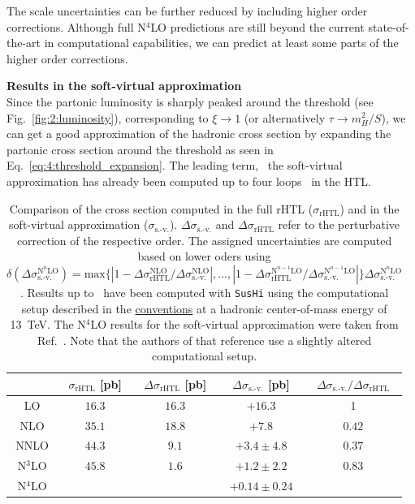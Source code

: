 The scale uncertainties can be further reduced by including higher order corrections. Although full N${}^4$LO predictions are still beyond the current state-of-the-art in computational capabilities, we can predict at least some parts of the higher order corrections.

\textbf{Results in the soft-virtual approximation}\\
Since the partonic luminosity is sharply peaked around the threshold (see Fig.~\ref{fig:2:luminosity}), corresponding to $\xi \rightarrow 1$ (or alternatively $\tau \rightarrow m_H^2/S$), we can get a good approximation of the hadronic cross section by expanding the partonic cross section around the threshold as seen in Eq.~\eqref{eq:4:threshold_expansion}. The leading term, \ie\ the soft-virtual approximation has already been computed up to four loops~\cite{Das:2020adl} in the \acs{HTL}.
\begin{table}[ht]
\centering
\begin{tabular}{ccccc}
& $\sigma_\text{rHTL}$ [pb] & $\Delta \sigma_\text{rHTL}$ [pb] & $\Delta \sigma_{\text{s.-v.}}$ [pb] & $\Delta\sigma_{\text{s.-v.}}/\Delta\sigma_\text{rHTL}$ \\
\hline
LO & $16.3$ & $16.3$ & $+16.3$ & 1 \\
NLO & $35.1$ & $18.8$ & $+7.8$ & $0.42$ \\
NNLO & $44.3$ & $9.1$ & $+3.4 \pm 4.8$ & $0.37$ \\
N${}^3$LO & $45.8$ & $1.6$ & $+1.2 \pm 2.2$ & $0.83$ \\
N${}^4$LO &  &  & $+0.14 \pm 0.24$ & \\
\end{tabular}
\caption{Comparison of the cross section computed in the full \acs{rHTL} ($\sigma_\text{rHTL}$) and in the soft-virtual approximation ($\sigma_{\text{s.-v.}}$). $\Delta \sigma_{\text{s.-v.}}$ and $\Delta \sigma_{\text{rHTL}}$ refer to the perturbative correction of the respective order. The assigned uncertainties are computed based on lower oders using $\delta(\Delta  \sigma^{\text{N}^n\text{LO}}_{\text{s.-v.}}) =  \text{max} \lbrace | 1 - \Delta \sigma^{\text{NLO}}_\text{rHTL}/ \Delta \sigma^{\text{NLO}}_{\text{s.-v.}}|,\ldots,  | 1 - \Delta \sigma^{\text{N}^{n-1}\text{LO}}_\text{rHTL}/\Delta \sigma^{\text{N}^{n-1}\text{LO}}_{\text{s.-v.}} | \rbrace \Delta  \sigma^{\text{N}^n\text{LO}}_{\text{s.-v.}}$. Results up to \NNNLO\ have been computed with \texttt{SusHi} using the computational setup described in the \hyperref[chap:notation_and_conventions]{conventions} at a hadronic center-of-mass energy of 13~TeV. The N${}^4$LO results for the soft-virtual approximation were taken from Ref.~\cite{Das:2020adl}. Note that the authors of that reference use a slightly altered computational setup.}
\label{tab:4:soft_virtual_approximation}
\end{table}
